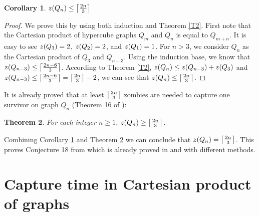 \documentclass[1p]{elsarticle}
\DeclarePairedDelimiter\ceil{\lceil}{\rceil} \DeclarePairedDelimiter\floor{\lfloor}{\rfloor}
\newtheorem{theorem}{Theorem}
\newtheorem{corollary}[theorem]{Corollary}
\newcommand{\zn}{\ooalign{$z$\cr\hfil\rule[.5ex]{.2em}{.08ex}\hfil\cr}}
\begin{document}
\begin{corollary}
	\label{C3}
	$\zn(Q_{n}) \leq \ceil*{\frac{2n}{3}}$
\end{corollary}
\begin{proof}
	We prove this by using both induction and Theorem \ref{T2}. First note that the Cartesian product of
	hypercube graphs $Q_{m}$ and $Q_{n}$ is equal to $Q_{m+n}$. It is easy to see $\zn(Q_3) = 2$, $\zn(Q_2) = 2$, and
	$\zn(Q_1) = 1$. For $n > 3$, we consider $Q_n$ as the Cartesian product of $Q_3$ and $Q_{n-3}$. Using the induction
	base, we know that $\zn(Q_{n-3}) \leq \ceil*{\frac{2n - 6}{3}}$. According to Theorem \ref{T2}, $\zn(Q_n) \leq
	\zn(Q_{n-3}) + \zn(Q_3)$ and $\zn(Q_{n-3}) \leq \ceil*{\frac{2n - 6}{3}} = \ceil*{\frac{2n}{3}} - 2$, we can see that
	$\zn(Q_n) \leq \ceil*{\frac{2n}{3}}$.
\end{proof}

It is already proved that at least $\ceil*{\frac{2n}{3}}$ zombies are needed to capture one survivor on graph $Q_n$
(Theorem 16 of \cite{Fitz16}):

\begin{theorem}
	\label{T4}
	For each integer $n \geq 1$, $\zn(Q_n) \geq \ceil*{\frac{2n}{3}} $.
\end{theorem}

Combining Corollary \ref{C3} and Theorem \ref{T4} we can conclude that $\zn(Q_n) = \ceil*{\frac{2n}{3}}$.
This proves Conjecture 18 from \cite{Fitz16} which is already proved in \cite{Offner19} and \cite{Fitz18} with different methods. 

\section{Capture time in Cartesian product of graphs}\label{capturetime} 
\end{document}
